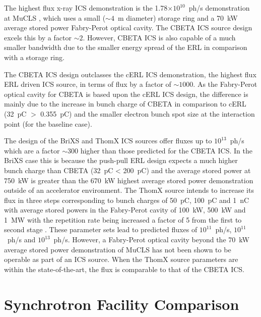 \documentclass[../main.tex]{subfiles}
\begin{document}
The highest flux x-ray ICS demonstration is the 1.78$\times 10^{10}$~ph/\si{\second} demonstration at MuCLS \cite{eggl2016munich}, which uses a small ($\sim4$~\si{\meter} diameter) storage ring and a 70~\si{\kilo\watt} average stored power Fabry-Perot optical cavity. The CBETA ICS source design excels this by a factor $\sim2$. However, CBETA ICS is also capable of a much smaller bandwidth due to the smaller energy spread of the ERL in comparison with a storage ring.

The CBETA ICS design outclasses the cERL ICS demonstration, the highest flux ERL driven ICS source, in terms of flux by a factor of $\sim1000$. As the Fabry-Perot optical cavity for CBETA is based upon the cERL ICS design, the difference is mainly due to the increase in bunch charge of CBETA in comparison to cERL (32~\si{\pico\coulomb} $>$ 0.355~\si{\pico\coulomb}) and the smaller electron bunch spot size at the interaction point (for the baseline case).

The design of the BriXS and ThomX ICS sources offer fluxes up to $10^{13}$~ph/\si{\second} which are a factor $\sim300$ higher than those predicted for the CBETA ICS. In the BriXS case this is because the push-pull ERL design expects a much higher bunch charge than CBETA (32~\si{\pico\coulomb} < 200~\si{\pico\coulomb}) \cite{drebot2019brixs} and the average stored power at 750~\si{\kilo\watt} \cite{drebot2019brixs} is greater than the 670~\si{\kilo\watt} highest average stored power demonstration \cite{carstens2014megawatt} outside of an accelerator environment. The ThomX source intends to increase its flux in three steps corresponding to bunch charges of 50~\si{\pico\coulomb}, 100~\si{\pico\coulomb} and 1~\si{\nano\coulomb} with average stored powers in the Fabry-Perot cavity of 100~\si{\kilo\watt}, 500~\si{\kilo\watt} and 1~\si{\mega\watt} with the repetition rate being increased a factor of 5 from the first to second stage \cite{dupraz2020thomx}. These parameter sets lead to predicted fluxes of $10^{11}$~ph/\si{\second}, $10^{11}$~ph/\si{\second} and $10^{13}$~ph/\si{\second}. However, a Fabry-Perot optical cavity beyond the 70~\si{\kilo\watt} average stored power demonstration of MuCLS \cite{eggl2016munich} has not been shown to be operable as part of an ICS source. When the ThomX source parameters are within the state-of-the-art, the flux is comparable to that of the CBETA ICS.   


\section{Synchrotron Facility Comparison}
\label{sec:synchrotron_facility_comparison}
\end{document}
